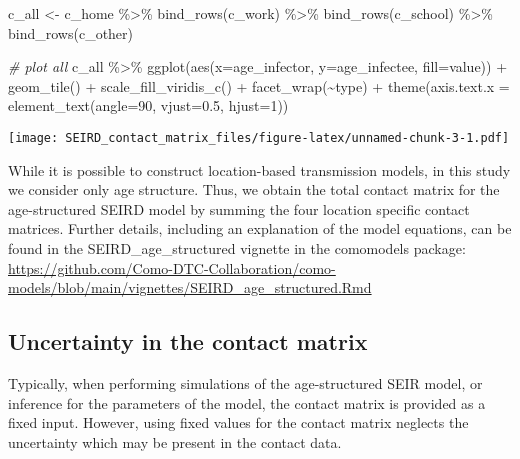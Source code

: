 \documentclass[
]{article}
\newenvironment{Shaded}{\begin{snugshade}}{\end{snugshade}}
\newcommand{\AttributeTok}[1]{\textcolor[rgb]{0.77,0.63,0.00}{#1}}
\newcommand{\CommentTok}[1]{\textcolor[rgb]{0.56,0.35,0.01}{\textit{#1}}}
\newcommand{\DecValTok}[1]{\textcolor[rgb]{0.00,0.00,0.81}{#1}}
\newcommand{\FloatTok}[1]{\textcolor[rgb]{0.00,0.00,0.81}{#1}}
\newcommand{\FunctionTok}[1]{\textcolor[rgb]{0.00,0.00,0.00}{#1}}
\newcommand{\NormalTok}[1]{#1}
\newcommand{\OtherTok}[1]{\textcolor[rgb]{0.56,0.35,0.01}{#1}}
\newcommand{\SpecialCharTok}[1]{\textcolor[rgb]{0.00,0.00,0.00}{#1}}
\begin{document}
\begin{Shaded}
\begin{Highlighting}[]
\NormalTok{c\_all }\OtherTok{\textless{}{-}}\NormalTok{ c\_home }\SpecialCharTok{\%\textgreater{}\%}
  \FunctionTok{bind\_rows}\NormalTok{(c\_work) }\SpecialCharTok{\%\textgreater{}\%} 
  \FunctionTok{bind\_rows}\NormalTok{(c\_school) }\SpecialCharTok{\%\textgreater{}\%} 
  \FunctionTok{bind\_rows}\NormalTok{(c\_other)}

\CommentTok{\# plot all}
\NormalTok{c\_all }\SpecialCharTok{\%\textgreater{}\%}
  \FunctionTok{ggplot}\NormalTok{(}\FunctionTok{aes}\NormalTok{(}\AttributeTok{x=}\NormalTok{age\_infector, }\AttributeTok{y=}\NormalTok{age\_infectee, }\AttributeTok{fill=}\NormalTok{value)) }\SpecialCharTok{+}
  \FunctionTok{geom\_tile}\NormalTok{() }\SpecialCharTok{+}
  \FunctionTok{scale\_fill\_viridis\_c}\NormalTok{() }\SpecialCharTok{+}
  \FunctionTok{facet\_wrap}\NormalTok{(}\SpecialCharTok{\textasciitilde{}}\NormalTok{type) }\SpecialCharTok{+}
  \FunctionTok{theme}\NormalTok{(}\AttributeTok{axis.text.x =} \FunctionTok{element\_text}\NormalTok{(}\AttributeTok{angle=}\DecValTok{90}\NormalTok{, }\AttributeTok{vjust=}\FloatTok{0.5}\NormalTok{, }\AttributeTok{hjust=}\DecValTok{1}\NormalTok{))}
\end{Highlighting}
\end{Shaded}

\texttt{[image: SEIRD\_contact\_matrix\_files/figure-latex/unnamed-chunk-3-1.pdf]}

While it is possible to construct location-based transmission models, in
this study we consider only age structure. Thus, we obtain the total
contact matrix for the age-structured SEIRD model by summing the four
location specific contact matrices. Further details, including an
explanation of the model equations, can be found in the
SEIRD\_age\_structured vignette in the comomodels package:
\url{https://github.com/Como-DTC-Collaboration/como-models/blob/main/vignettes/SEIRD_age_structured.Rmd}

\hypertarget{uncertainty-in-the-contact-matrix}{%
\subsection{Uncertainty in the contact
matrix}\label{uncertainty-in-the-contact-matrix}}

Typically, when performing simulations of the age-structured SEIR model,
or inference for the parameters of the model, the contact matrix is
provided as a fixed input. However, using fixed values for the contact
matrix neglects the uncertainty which may be present in the contact
data.
\end{document}
